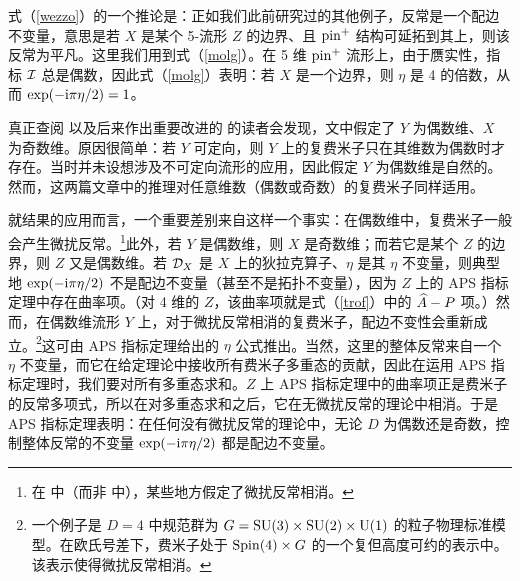 式（\ref{wezzo}）的一个推论是：正如我们此前研究过的其他例子，反常是一个配边不变量，意思是若 $X$ 是某个 5-流形 $Z$ 的边界、且 ${\mathrm{pin}}^+$ 结构可延拓到其上，则该反常为平凡。这里我们用到式（\ref{molg}）。在 5 维 ${\mathrm{pin}}^+$ 流形上，由于赝实性，指标 ${\mathcal I}$ 总是偶数，因此式（\ref{molg}）表明：若 $X$ 是一个边界，则 $\eta$ 是 4 的倍数，从而 $\exp(-{\mathrm i}\pi\eta/2)=1$。


真正查阅 \cite{Global} 以及后来作出重要改进的 \cite{DF} 的读者会发现，文中假定了 $Y$ 为偶数维、$X$ 为奇数维。原因很简单：若 $Y$ 可定向，则 $Y$ 上的复费米子只在其维数为偶数时才存在。当时并未设想涉及不可定向流形的应用，因此假定 $Y$ 为偶数维是自然的。然而，这两篇文章中的推理对任意维数（偶数或奇数）的复费米子同样适用。

就结果的应用而言，一个重要差别来自这样一个事实：在偶数维中，复费米子一般会产生微扰反常。\footnote{在 \cite{Global} 中（而非 \cite{DF} 中），某些地方假定了微扰反常相消。}此外，若 $Y$ 是偶数维，则 $X$ 是奇数维；而若它是某个 $Z$ 的边界，则 $Z$ 又是偶数维。若 ${\mathcal D}_X$ 是 $X$ 上的狄拉克算子、$\eta$ 是其 $\eta$ 不变量，则典型地 $\exp(-{\mathrm i}\pi\eta/2)$ 不是配边不变量（甚至不是拓扑不变量），因为 $Z$ 上的 APS 指标定理中存在曲率项。（对 4 维的 $Z$，该曲率项就是式（\ref{trof}）中的 ${\widehat A}-P$ 项。）然而，在偶数维流形 $Y$ 上，对于微扰反常相消的复费米子，配边不变性会重新成立。\footnote{一个例子是 $D=4$ 中规范群为 $G={\mathrm{SU}}(3)\times {\mathrm{SU}}(2)\times {\mathrm U}(1)$ 的粒子物理标准模型。在欧氏号差下，费米子处于 ${\mathrm{Spin}}(4)\times G$ 的一个复但高度可约的表示中。该表示使得微扰反常相消。}这可由 APS 指标定理给出的 $\eta$ 公式推出。当然，这里的整体反常来自一个 $\eta$ 不变量，而它在给定理论中接收所有费米子多重态的贡献，因此在运用 APS 指标定理时，我们要对所有多重态求和。$Z$ 上 APS 指标定理中的曲率项正是费米子的反常多项式，所以在对多重态求和之后，它在无微扰反常的理论中相消。于是 APS 指标定理表明：在任何没有微扰反常的理论中，无论 $D$ 为偶数还是奇数，控制整体反常的不变量 $\exp(-{\mathrm i}\pi\eta/2)$ 都是配边不变量。


